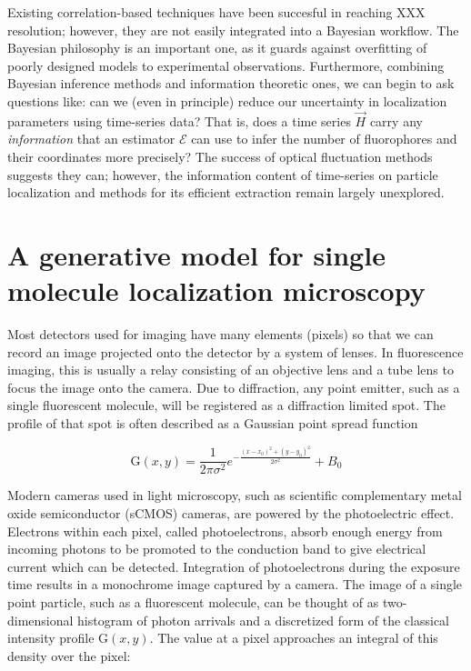\documentclass{ucetd}
\begin{document}
Existing correlation-based techniques have been succesful in reaching XXX resolution; however, they are not easily integrated into a Bayesian workflow. The Bayesian philosophy is an important one, as it guards against overfitting of poorly designed models to experimental observations. Furthermore, combining Bayesian inference methods and information theoretic ones, we can begin to ask questions like: can we (even in principle) reduce our uncertainty in localization parameters using time-series data? That is, does a time series $\vec{H}$ carry any \emph{information} that an estimator $\mathcal{E}$ can use to infer the number of fluorophores and their coordinates more precisely? The success of optical fluctuation methods suggests they can; however, the information content of time-series on particle localization and methods for its efficient extraction remain largely unexplored. 

\section{A generative model for single molecule localization microscopy}

Most detectors used for imaging have many elements (pixels) so that we can record an image projected onto the detector by a system of lenses. In fluorescence imaging, this is usually a relay consisting of an objective lens and a tube lens to focus the image onto the camera. Due to diffraction, any point emitter, such as a single fluorescent molecule, will be registered as a diffraction limited spot. The profile of that spot is often described as a Gaussian point spread function

\begin{equation}
\mathrm{G}(x,y) = \frac{1}{2\pi\sigma^{2}}e^{-\frac{(x-x_{0})^{2}+(y-y_{0})^{2}}{2\sigma^{2}}} + B_0
\end{equation}


Modern cameras used in light microscopy, such as scientific complementary metal oxide semiconductor (sCMOS) cameras, are powered by the photoelectric effect. Electrons within each pixel, called photoelectrons, absorb enough energy from incoming photons to be promoted to the conduction band to give electrical current which can be detected. Integration of photoelectrons during the exposure time results in a monochrome image captured by a camera. The image of a single point particle, such as a fluorescent molecule, can be thought of as two-dimensional histogram of photon arrivals and a discretized form of the classical intensity profile $\mathrm{G}(x,y)$. The value at a pixel approaches an integral of this density over the pixel:
\end{document}
